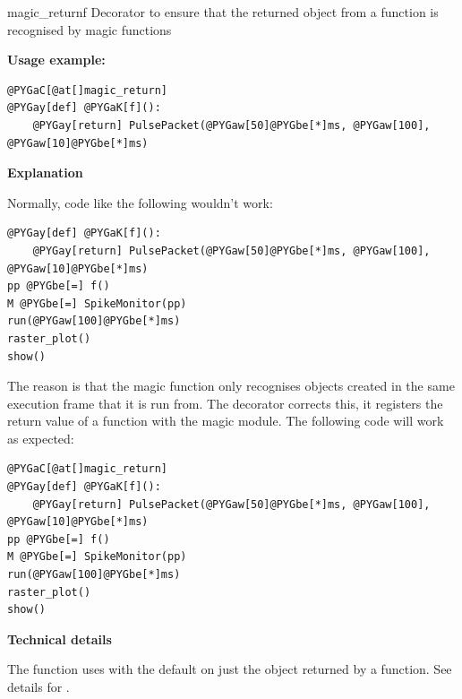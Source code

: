 \documentclass[letterpaper,10pt]{manual}
\begin{document}
\hypertarget{brian.magic_return}{}\begin{funcdesc}{magic\_return}{f}
Decorator to ensure that the returned object from a function is recognised by magic functions

\textbf{Usage example:}

\begin{Verbatim}[commandchars=@\[\]]
@PYGaC[@at[]magic_return]
@PYGay[def] @PYGaK[f]():
    @PYGay[return] PulsePacket(@PYGaw[50]@PYGbe[*]ms, @PYGaw[100], @PYGaw[10]@PYGbe[*]ms)
\end{Verbatim}

\textbf{Explanation}

Normally, code like the following wouldn't work:

\begin{Verbatim}[commandchars=@\[\]]
@PYGay[def] @PYGaK[f]():
    @PYGay[return] PulsePacket(@PYGaw[50]@PYGbe[*]ms, @PYGaw[100], @PYGaw[10]@PYGbe[*]ms)
pp @PYGbe[=] f()
M @PYGbe[=] SpikeMonitor(pp)
run(@PYGaw[100]@PYGbe[*]ms)
raster_plot()
show()
\end{Verbatim}

The reason is that the magic function \hyperlink{brian.run}{} only recognises objects created
in the same execution frame that it is run from. The \hyperlink{brian.magic_return}{} decorator
corrects this, it registers the return value of a function with the magic
module. The following code will work as expected:

\begin{Verbatim}[commandchars=@\[\]]
@PYGaC[@at[]magic_return]
@PYGay[def] @PYGaK[f]():
    @PYGay[return] PulsePacket(@PYGaw[50]@PYGbe[*]ms, @PYGaw[100], @PYGaw[10]@PYGbe[*]ms)
pp @PYGbe[=] f()
M @PYGbe[=] SpikeMonitor(pp)
run(@PYGaw[100]@PYGbe[*]ms)
raster_plot()
show()
\end{Verbatim}

\textbf{Technical details}

The \hyperlink{brian.magic_return}{} function uses \hyperlink{brian.magic_register}{} with the default 
on just the object returned by a function. See details for \hyperlink{brian.magic_register}{}.
\end{funcdesc}
\end{document}
